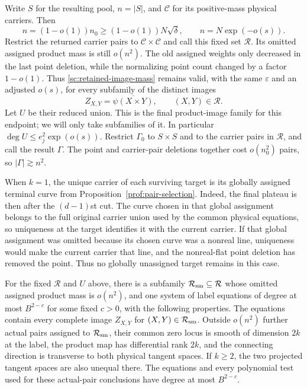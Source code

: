 Write $S$ for the resulting pool, $n=|S|$, and $\mathcal C$ for its
positive-mass physical carriers.  Then
\begin{equation}\label{sc:outer-retained-pool}
 n=(1-o(1))n_0\ge(1-o(1))N\sqrt\delta,
 \qquad n=N\exp(-o(s)).
\end{equation}
Restrict the returned carrier pairs to $\mathcal C\times\mathcal C$
and call this fixed set $\mathcal R$.  Its omitted assigned product mass
is still $o(n^2)$.  The old assigned weights only decreased in the last
point deletion, while the normalizing point count changed by a factor
$1-o(1)$.  Thus \eqref{sc:retained-image-mass} remains valid, with the
same $\varepsilon$ and an adjusted $o(s)$, for every subfamily of the
distinct images
\[
 Z_{X,Y}=\overline{\psi(X\times Y)},\qquad (X,Y)\in\mathcal R.
\]
Let $U$ be their reduced union.  This is the final product-image family
for this endpoint; we will only take subfamilies of it.  In particular
$\deg U\le e_j^2\exp(o(s))$.  Restrict $\Gamma_0$ to $S\times S$ and
to the carrier pairs in $\mathcal R$, and call the result $\Gamma$.
The point and carrier-pair deletions together cost $o(n_0^2)$ pairs, so
$|\Gamma|\gtrsim n^2$.

When $k=1$, the unique carrier of each surviving target is its globally
assigned terminal curve from Proposition~\ref{prof:pair-selection}.
Indeed, the final plateau is then after the $(d-1)$st cut.  The curve
chosen in that global assignment belongs to the full original carrier
union used by the common physical equations, so uniqueness at the target
identifies it with the current carrier.  If that global assignment was
omitted because its chosen curve was a nonreal line, uniqueness would
make the current carrier that line, and the nonreal-flat point deletion
has removed the point.  Thus no globally unassigned target remains in
this case.

\begin{lemma}
\label{sc:outer-regularity}
For the fixed $\mathcal R$ and $U$ above, there is a subfamily
$\mathcal R_{\rm sm}\subseteq\mathcal R$ whose omitted assigned product
mass is $o(n^2)$, and one system of label equations of degree at most
$B^{2-c}$ for some fixed $c>0$, with the following properties.
The equations contain every complete image $Z_{X,Y}$ for
$(X,Y)\in\mathcal R_{\rm sm}$.  Outside $o(n^2)$ further actual pairs
assigned to $\mathcal R_{\rm sm}$, their common zero locus is smooth of
dimension $2k$ at the label, the product map has differential rank
$2k$, and the connecting direction is transverse to both physical
tangent spaces.  If $k\ge2$, the two projected tangent spaces are also
unequal there.  The equations and every polynomial test used for these
actual-pair conclusions have degree at most $B^{2-c}$.
\end{lemma}

